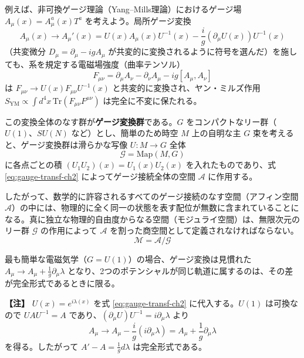 \documentclass[uplatex, dvipdfmx, book]{jsbook}
\newenvironment{note}{\vspace{1ex}\par\footnotesize\noindent\textbf{【注】}}{\par\vspace{1ex}}
\begin{document}
例えば、非可換ゲージ理論（Yang--Mills理論）におけるゲージ場 $A_\mu(x) = A_\mu^a(x) T^a$ を考えよう。局所ゲージ変換
\begin{equation}
    A_\mu(x) \to A_\mu'(x) = U(x) A_\mu(x) U^{-1}(x) - \frac{i}{g} (\partial_\mu U(x)) U^{-1}(x)
    \label{eq:gauge-transf-ch2}
\end{equation}
（共変微分 $D_\mu = \partial_\mu - igA_\mu$ が共変的に変換されるように符号を選んだ）を施しても、系を規定する電磁場強度（曲率テンソル）
\begin{equation}
    F_{\mu\nu} = \partial_\mu A_\nu - \partial_\nu A_\mu - ig [A_\mu, A_\nu]
\end{equation}
は $F_{\mu\nu} \to U(x) F_{\mu\nu} U^{-1}(x)$ と共変的に変換され、ヤン・ミルズ作用 $S_{\text{YM}} \propto \int d^4x \, \text{Tr}(F_{\mu\nu}F^{\mu\nu})$ は完全に不変に保たれる。

この変換全体のなす群が\textbf{ゲージ変換群}である。$G$ をコンパクトなリー群（$U(1)$、$SU(N)$ など）とし、簡単のため時空 $M$ 上の自明な主 $G$ 束を考えると、ゲージ変換群は滑らかな写像 $U: M \to G$ 全体
\begin{equation}
    \mathcal{G} = \mathrm{Map}(M, G)
\end{equation}
に各点ごとの積 $(U_1 U_2)(x) = U_1(x) U_2(x)$ を入れたものであり、式 \eqref{eq:gauge-transf-ch2} によってゲージ接続全体の空間 $\mathcal{A}$ に作用する。

したがって、数学的に許容されるすべてのゲージ接続のなす空間（アフィン空間 $\mathcal{A}$）の中には、物理的に全く同一の状態を表す配位が無数に含まれていることになる。真に独立な物理的自由度からなる空間（モジュライ空間）は、無限次元のリー群 $\mathcal{G}$ の作用によって $\mathcal{A}$ を割った商空間として定義されなければならない。
\begin{equation}
    \mathcal{M} = \mathcal{A} / \mathcal{G}
\end{equation}

最も簡単な電磁気学（$G = U(1)$）の場合、ゲージ変換は見慣れた $A_\mu \to A_\mu + \frac{1}{g}\partial_\mu\lambda$ となり、2つのポテンシャルが同じ軌道に属するのは、その差が完全形式であるときに限る。

\begin{note}
$U(x) = e^{i\lambda(x)}$ を式 \eqref{eq:gauge-transf-ch2} に代入する。$U(1)$ は可換なので $U A U^{-1} = A$ であり、$(\partial_\mu U) U^{-1} = i\partial_\mu\lambda$ より
\begin{equation*}
    A_\mu \to A_\mu - \frac{i}{g}(i\partial_\mu \lambda) = A_\mu + \frac{1}{g}\partial_\mu \lambda
\end{equation*}
を得る。したがって $A' - A = \frac{1}{g}d\lambda$ は完全形式である。
\end{note}
\end{document}

